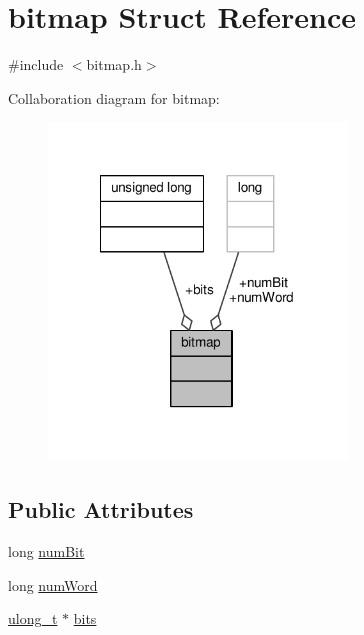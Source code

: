 \hypertarget{structbitmap}{\section{bitmap Struct Reference}
\label{structbitmap}
}


{\ttfamily \#include $<$bitmap.\-h$>$}



Collaboration diagram for bitmap\-:
\nopagebreak
\begin{figure}[H]
\begin{center}
\leavevmode
\includegraphics[width=225pt]{structbitmap__coll__graph}
\end{center}
\end{figure}
\subsection*{Public Attributes}
\begin{DoxyCompactItemize}
\item 
long \hyperlink{structbitmap_a076c858dc4d7d78d39038f46f4dccd9d}{num\-Bit}
\item 
long \hyperlink{structbitmap_ab8c641dc2f7969f429af2364844cd192}{num\-Word}
\item 
\hyperlink{types_8h_a95c0f4cc152cbacf72a7d70d7077dc96}{ulong\-\_\-t} $\ast$ \hyperlink{structbitmap_a187e35fe7f42ecd0962d32c6919d1c7b}{bits}
\end{DoxyCompactItemize}


